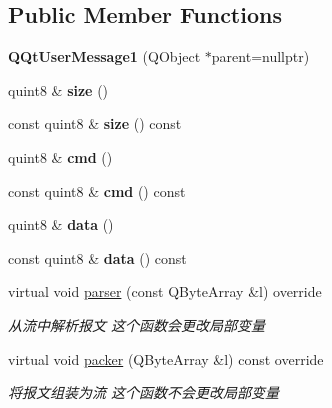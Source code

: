 \subsection*{Public Member Functions}
\begin{DoxyCompactItemize}
\item 
\mbox{\label{class_q_qt_user_message1_a3e3ce3fc24de6596a5406d7d5fd66cb9}} 
{\bfseries Q\+Qt\+User\+Message1} (Q\+Object $\ast$parent=nullptr)
\item 
\mbox{\label{class_q_qt_user_message1_af43dba2c62eb1f3e8268dafc6e3ac05c}} 
quint8 \& {\bfseries size} ()
\item 
\mbox{\label{class_q_qt_user_message1_a95c76de7282f50d913bf32665e4255c5}} 
const quint8 \& {\bfseries size} () const
\item 
\mbox{\label{class_q_qt_user_message1_a38dcbf582b44ca54153371d150f834fa}} 
quint8 \& {\bfseries cmd} ()
\item 
\mbox{\label{class_q_qt_user_message1_aa9b71d52d8fe793f392c0b920cc79e91}} 
const quint8 \& {\bfseries cmd} () const
\item 
\mbox{\label{class_q_qt_user_message1_a703084f68e5937f7b9e689dcdb653c6a}} 
quint8 \& {\bfseries data} ()
\item 
\mbox{\label{class_q_qt_user_message1_a82daae1bfb164bf8cb1831a0082005e1}} 
const quint8 \& {\bfseries data} () const
\item 
virtual void \mbox{\hyperlink{class_q_qt_user_message1_a166f18692d123ac51dbf314717d41a5b}{parser}} (const Q\+Byte\+Array \&l) override
\begin{DoxyCompactList}\small\item\em 从流中解析报文 这个函数会更改局部变量 \end{DoxyCompactList}\item 
virtual void \mbox{\hyperlink{class_q_qt_user_message1_a10565bf777393d39e5fd2de9cf356344}{packer}} (Q\+Byte\+Array \&l) const override
\begin{DoxyCompactList}\small\item\em 将报文组装为流 这个函数不会更改局部变量 \end{DoxyCompactList}\end{DoxyCompactItemize}


